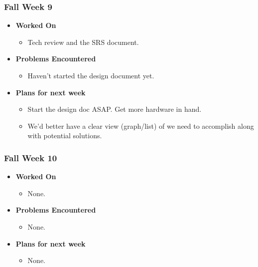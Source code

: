 \documentclass[compsoc,draftclsnofoot,onecolumn,10pt]{IEEEtran}
\begin{document}
\subsubsection{Fall Week 9}
\begin{itemize}
    \item {\textbf{Worked On}}
    \begin{itemize}
      \item Tech review and the SRS document.
    \end{itemize}

    \item {\textbf{Problems Encountered}}
    \begin{itemize}
      \item Haven't started the design document yet.
    \end{itemize}

    \item{\textbf{Plans for next week}}
    \begin{itemize}
      \item Start the design doc ASAP. Get more hardware in hand.
      \item We'd better have a clear view (graph/list) of we need
      to accomplish along with potential solutions.
    \end{itemize}

\end{itemize}

\subsubsection{Fall Week 10}
\begin{itemize}
    \item {\textbf{Worked On}}
    \begin{itemize}
      \item None.
    \end{itemize}

    \item {\textbf{Problems Encountered}}
    \begin{itemize}
      \item None.
    \end{itemize}

    \item{\textbf{Plans for next week}}
    \begin{itemize}
      \item None.
    \end{itemize}

\end{itemize}
\end{document}
